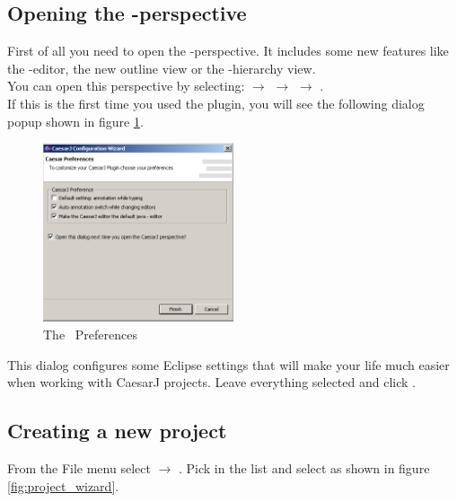 \subsection{Opening the \caesarj -perspective}
First of all you need to open the \caesarj -perspective. It includes some new features like the \caesar -editor, the new outline view or the \caesarj -hierarchy view.\\
You can open this perspective by selecting:  $\rightarrow$  $\rightarrow$  $\rightarrow$ .\\
If this is the first time you used the plugin, you will see the following dialog popup shown in figure \ref{fig:view_properties}.

\begin{figure}[htbp]
	\centering
		\includegraphics[width=0.5\textwidth]{images/view_properties.png}
	\caption{The \caesarj ~Preferences}	
	\label{fig:view_properties}
\end{figure}

This dialog configures some Eclipse settings that will make your life much easier when
working with CaesarJ projects. Leave everything selected and click
.

\subsection{Creating a new \caesarj project}
From the File menu select  $\rightarrow$ . Pick  in the list and select  as shown in figure \ref{fig:project_wizard}.

